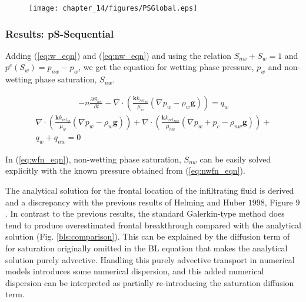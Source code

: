 \begin{figure}[!thb]
\begin{center}
\texttt{[image: chapter\_14/figures/PSGlobal.eps]}
\end{center}
\vspace{-8.0cm}
\caption{}
\label{blg:comparison}
\end{figure}

\subsubsection*{Results: pS-Sequential}
Adding (\ref{eq:w_eqn}) and (\ref{eq:nw_eqn}) and using the relation $S_{nw}+ S_w = 1$ and $p^{c}(S_w) = p_{nw} - p_w$, we get the equation for wetting phase pressure, $p_{w}$ and non-wetting phase saturation, $S_{nw}$.

\begin{align}
 - n\frac{{\partial S_{nw}}}{{\partial t }} -
\nabla \cdot \left({\frac{{\mathbf k {k_{rel}}_w }}{{\mu_w }}\left( {\nabla p_w - \rho _w
\mathbf g} \right)} \right) = q_w
\label{eq:wfn_eqn}
\end{align}
\begin{align}
\nabla \cdot \left({\frac{{\mathbf k {k_{rel}}_w }}{{\mu_w }}\left( {\nabla p_w - \rho _w
\mathbf g} \right)} \right) +
\nabla \cdot \left({\frac{{\mathbf k {k_{rel}}_{nw} }}{{\mu_{nw} }}\left( {\nabla {p_w+p_c} - \rho _{nw}\mathbf g} \right)} \right) + \nonumber\\q_w + q_{nw} =0
\label{eq:nwfn_eqn}
\end{align}

In (\ref{eq:wfn_eqn}), non-wetting phase saturation, $S_{nw}$ can be easily solved explicitly with the known pressure obtained from (\ref{eq:nwfn_eqn}).

The analytical solution for the frontal location of the infiltrating fluid is derived and a discrepancy with the previous results of Helming and Huber $1998$, Figure $9$. In contrast to the previous results, the standard Galerkin-type method does tend to produce overestimated frontal breakthrough compared with the analytical solution (Fig. \ref{bls:comparison}). This can be explained by the diffusion term of for saturation originally omitted in the BL equation that makes the analytical solution purely advective. Handling this purely advective transport in numerical models introduces some numerical dispersion, and this added numerical dispersion can be interpreted as partially re-introducing the saturation diffusion term.

